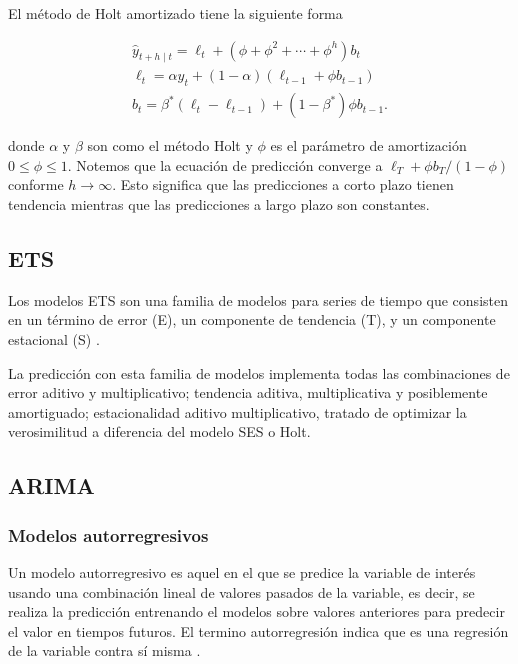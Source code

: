 El método de Holt amortizado tiene la siguiente forma

\begin{equation*}
	\begin{array}{cl} 
	\hat{y}_{t+h \mid t} =\ell_{t}+\left(\phi+\phi^{2}+\cdots+\phi^{h}\right) b_{t} \\
	\ell_{t} =\alpha y_{t}+(1-\alpha)\left(\ell_{t-1}+\phi b_{t-1}\right) \\
	b_{t}=\beta^{*}\left(\ell_{t}-\ell_{t-1}\right)+\left(1-\beta^{*}\right) \phi b_{t-1} .
	\end{array} 
\end{equation*}

donde $\alpha$ y $\beta$ son como el método Holt y $\phi$ es el parámetro de amortización $0 \leq \phi \leq 1$.
Notemos que la ecuación de predicción converge a $\ell_{T}+\phi b_{T} /(1-\phi)$ conforme $h \rightarrow \infty$. Esto significa que las predicciones a corto plazo tienen tendencia mientras que las predicciones a largo plazo son constantes.

\subsection{ETS}

Los modelos ETS son una familia de modelos para series de tiempo que consisten en un término de error (E), un componente de tendencia (T), y un componente estacional (S) \parencite{ETSModelsStatsmodels}.

La predicción con esta familia de modelos implementa todas las combinaciones de error aditivo y multiplicativo; tendencia aditiva, multiplicativa y posiblemente amortiguado; estacionalidad aditivo multiplicativo, tratado de optimizar la verosimilitud a diferencia del modelo SES o Holt.


\subsection{ARIMA}

\subsubsection{Modelos autorregresivos}

Un modelo autorregresivo es aquel en el que se predice la variable de interés usando una combinación lineal de valores pasados de la variable, es decir, se realiza la predicción entrenando el modelos sobre valores anteriores para predecir el valor en tiempos futuros. El termino autorregresión indica que es una regresión de la variable contra sí misma \parencite{hyndmanForecastingPrinciplesPractice2018}.

